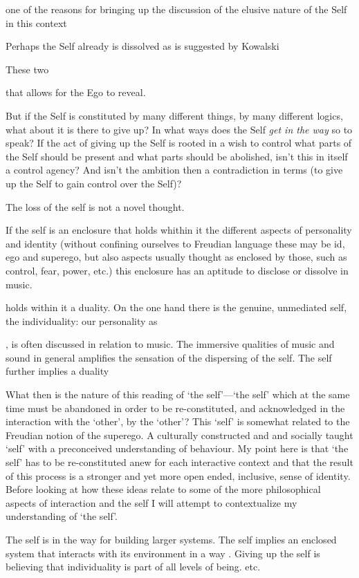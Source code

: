  \newpage

one of the reasons for bringing up the discussion of the elusive nature of the Self in this context

Perhaps the Self already is dissolved as is suggested by Kowalski

These two 

that allows for the Ego to reveal.

But if the Self is constituted by many different things, by many different logics, what about it is there to give up? In what ways does the Self \emph{get in the way} so to speak? If the act of giving up the Self is rooted in a wish to control what parts of the Self should be present and what parts should be abolished, isn't this in itself a control agency? And isn't the ambition then a contradiction in terms (to give up the Self to gain control over the Self)?

The loss of the self is not a novel thought. 

If the self is an enclosure that holds whithin it the different aspects of personality and identity (without confining ourselves to Freudian language these may be id, ego and superego, but also aspects usually thought as enclosed by those, such as control, fear, power, etc.) this enclosure has an aptitude to disclose or dissolve in music.

holds within it a duality. On the one hand there is the genuine, unmediated self, the individuality: our personality as 

, is often discussed in relation to music. The immersive qualities of music and sound in general amplifies the sensation of the dispersing of the self. The self further implies a duality

What then is the nature of this reading of `the self'---`the self' which at the same time must be abandoned in order to be re-constituted, and acknowledged in the interaction with the `other', by the `other'? This `self' is somewhat related to the Freudian notion of the superego. A culturally constructed and and socially taught `self' with a preconceived understanding of behaviour. My point here is that `the self' has to be re-constituted anew for each interactive context and that the result of this process is a stronger and yet more open ended, inclusive, sense of identity. Before looking at how these ideas relate to some of the more philosophical aspects of interaction and the self I will attempt to contextualize my understanding of `the self'.

The self is in the way for building larger systems. The self implies an enclosed system that interacts with its environment in a way . Giving up the self is believing that individuality is part of all levels of being. etc.


